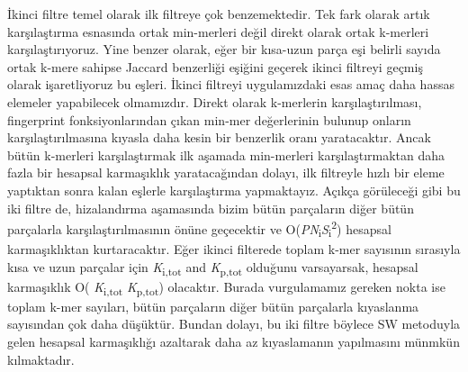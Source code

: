 İkinci filtre temel olarak ilk filtreye çok benzemektedir. Tek fark olarak artık karşılaştırma esnasında ortak min-merleri değil direkt olarak ortak k-merleri karşılaştırıyoruz. Yine benzer olarak, eğer bir kısa-uzun parça eşi belirli sayıda ortak k-mere sahipse Jaccard benzerliği eşiğini geçerek ikinci filtreyi geçmiş olarak işaretliyoruz bu eşleri. İkinci filtreyi uygulamızdaki esas amaç daha hassas elemeler yapabilecek olmamızdır. Direkt olarak k-merlerin karşılaştırılması, fingerprint fonksiyonlarından çıkan min-mer değerlerinin bulunup onların karşılaştırılmasına kıyasla daha kesin bir benzerlik oranı yaratacaktır. Ancak bütün k-merleri karşılaştırmak ilk aşamada min-merleri karşılaştırmaktan daha fazla bir hesapsal karmaşıklık yaratacağından dolayı, ilk filtreyle hızlı bir eleme yaptıktan sonra kalan eşlerle karşılaştırma yapmaktayız. Açıkça görüleceği gibi bu iki filtre de, hizalandırma aşamasında bizim bütün parçaların diğer bütün parçalarla karşılaştırılmasının önüne geçecektir ve O(\textit{P}\textit{N}\textsubscript{i}\textbar\textit{S}\textsubscript{i}\textbar\textsuperscript{2}) hesapsal karmaşıklıktan kurtaracaktır. Eğer ikinci filterede toplam k-mer sayısının sırasıyla kısa ve uzun parçalar için \textit{K}\textsubscript{i,tot} and \textit{K}\textsubscript{p,tot} olduğunu varsayarsak, hesapsal karmaşıklık O( \textit{K}\textsubscript{i,tot} \textit{K}\textsubscript{p,tot}) olacaktır. Burada vurgulamamız gereken nokta ise toplam k-mer sayıları, bütün parçaların diğer bütün parçalarla kıyaslanma sayısından çok daha düşüktür. Bundan dolayı, bu iki filtre böylece SW metoduyla gelen hesapsal karmaşıklığı azaltarak daha az kıyaslamanın yapılmasını münmkün kılmaktadır.
